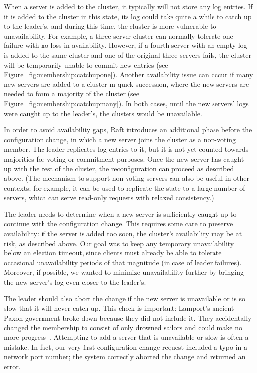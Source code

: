 When a server is added to the cluster, it typically will not store any
log entries. If it is added to the cluster in this state, its log could
take quite a while to catch up to the leader's, and during this time,
the cluster is more vulnerable to unavailability. For
example, a three-server cluster can normally tolerate one failure with
no loss in availability. However, if a fourth server with an empty log
is added to the same cluster and one of the original three servers
fails, the cluster will be temporarily unable to commit new entries (see
Figure~\ref{fig:membership:catchupone}). Another availability issue
can occur if many new servers are added to a cluster in
quick succession, where the new servers are needed to form a majority of
the cluster (see Figure~\ref{fig:membership:catchupmany}). In both
cases, until the new servers' logs were caught up to the leader's, the
clusters would be unavailable.

In order to avoid availability gaps, Raft introduces an additional phase
before the configuration change, in which a new server joins the cluster
as a non-voting member. The leader replicates log entries to it, but it
is not yet counted towards majorities for voting or commitment purposes.
Once the new server has caught up with the rest of the cluster, the
reconfiguration can proceed as described above. (The mechanism to
support non-voting servers can also be useful in other contexts; for
example, it can be used to replicate the state to a large number of
servers, which can serve read-only requests with relaxed consistency.)

The leader needs to determine when a new server is sufficiently caught
up to continue with the configuration change. This requires some care to
preserve availability: if the server is added too soon, the cluster's
availability may be at risk, as described above. Our goal was to keep
any temporary unavailability below an election timeout, since clients
must already be able to tolerate occasional unavailability periods of
that magnitude (in case of leader failures). Moreover, if possible, we
wanted to minimize unavailability further by bringing the new server's
log even closer to the leader's.

The leader should also abort the change if the new server is unavailable
or is so slow that it will never catch up. This check is important:
Lamport's ancient Paxon government broke down because they did not
include it. They accidentally changed the membership to consist of only
drowned sailors and could make no more progress~\cite{Lamport:1998}.
Attempting to add a server that is unavailable or slow is often a
mistake. In fact, our very first configuration change request
included a typo in a network port number; the system correctly aborted
the change and returned an error.


